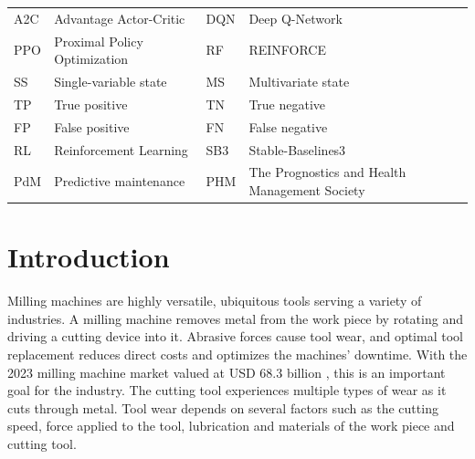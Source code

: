 \documentclass[a4paper, 12pt]{article}
\newcommand{\rowspace}[1]{\renewcommand{\arraystretch}{#1}}
\begin{document}
\begin{table}[!htbp]\centering
	\sffamily
	\rowspace{1.3}
	\begin{tabular}{L{1cm} L{4.5cm} L{1cm} L{4.5cm}}
		\toprule	
		
		A2C & Advantage Actor-Critic & DQN & Deep Q-Network\\
		PPO & Proximal Policy Optimization & RF & REINFORCE\\
		SS  & Single-variable state & MS & Multivariate state\\
		TP  & True positive &TN &True negative\\
		FP  & False positive &FN &False negative\\
		RL  & Reinforcement Learning & SB3 & Stable-Baselines3\\
		PdM & Predictive maintenance & PHM & The Prognostics and Health Management Society\\

		\bottomrule
	\end{tabular}
	\label{tbl:abbrev}
\end{table}

\newpage
\thispagestyle{empty}
{}
\section{Introduction}


Milling machines are highly versatile, ubiquitous tools serving a variety of industries. A milling machine removes metal from the work piece by rotating and driving a cutting device into it. Abrasive forces cause tool wear, and optimal tool replacement reduces direct costs and optimizes the machines' downtime. With the 2023 milling machine market valued at USD 68.3 billion \citep{milling-market}, this is an important goal for the industry. The cutting tool experiences multiple types of wear as it cuts through metal. Tool wear depends on several factors such as the cutting speed, force applied to the tool, lubrication and materials of the work piece and cutting tool. 
\end{document}
